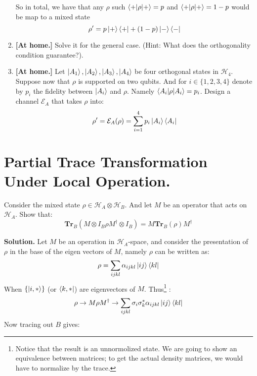 \documentclass[12pt,a4paper]{article}
\begin{document}
\begin{enumerate}
    So in total, we have that any $\rho$ such $\braket{+|\rho|+} = p $ and $\braket{+|\rho|+} = 1-p $ would be map to a mixed state 
    \begin{equation*}
    \rho^\prime = p\ket{+}\bra{+} + (1-p)\ket{-}\bra{-}    
    \end{equation*}
    
    \item \textbf{[At home.]} Solve it for the general case. (Hint: What does the orthogonality condition guarantee?). 
    \item \textbf{[At home.]} Let $\ket{A_1},\ket{A_2},\ket{A_3}, \ket{A_{4}}$ be four orthogonal states in $\mathcal{H}_{4}$. Suppose now that $\rho$ is supported on two qubits.  And for $i \in \{1,2,3,4\}$ denote by $p_{i}$ the fidelity between $\ket{A_i}$ and $\rho$. Namely $ \braket{A_i|\rho|A_i} = p_i$. Design a channel $\mathcal{E}_{A}$ that takes $\rho$ into:
    $$\rho^\prime = \mathcal{E}_{A}(\rho) =  \sum_{i=1}^{4}{p_{i}\ket{A_{i}}\bra{A_{i}}} $$  

\end{enumerate}

\section{Partial Trace Transformation Under Local Operation.}
Consider the mixed state $\rho \in \mathcal{H}_A \otimes \mathcal{H}_B$. And let $M$ be an operator that acts on $\mathcal{H}_{A}$. Show that:
\begin{equation*}
    \mathbf{Tr}_{B}\left( M \otimes I_{B} \rho M^\dagger \otimes I_{B} \right) = M \mathbf{Tr}_{B} \left( \rho \right) M^\dagger
\end{equation*}


\textbf{Solution.} Let $M$ be an operation in $\mathcal{H}_A$-space, and consider the presentation of $\rho$ in the base of the eigen vectors of $M$, namely $\rho$ can be written as: 
\begin{equation*}
    \rho = \sum_{ijkl}{ \alpha_{ijkl}\ket{ij}\bra{kl}}
\end{equation*}
When $\{ \ket{i,*} \}$ (or $\bra{k,*}$) are eigenvectors of $M$. Thus\footnote{Notice that the result is an unnormolized state. We are going to show an equivalence between matrices; to get the actual density matrices, we would have to normalize by the trace. } : 
\begin{equation*}
    \rho \rightarrow M \rho M^\dagger \rightarrow \sum_{ijkl}{ \sigma_{i}\sigma^{*}_{k}\alpha_{ijkl}\ket{ij}\bra{kl}}
\end{equation*}
Now tracing out $B$ gives:
\end{document}
